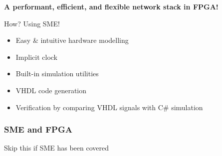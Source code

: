 \documentclass{beamer}
\begin{document}
\begin{frame}
\begin{center}
  \textbf{A performant, efficient, and flexible network stack in FPGA!}
\end{center}

\begin{block}{How?    Using SME!}
  \begin{itemize}
    \item Easy \& intuitive hardware modelling
    \item Implicit clock
    \item Built-in simulation utilities 
    \item VHDL code generation 
    \item Verification by comparing VHDL signals with C\# simulation
  \end{itemize}
\end{block}

\end{frame}

\begin{frame}
  \frametitle{SME and FPGA}

  Skip this if SME has been covered
\end{frame}
\end{document}
